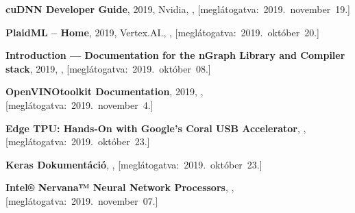 \begin{thebibliography}{9}


	\textbf{cuDNN Developer Guide},
	2019,
	Nvidia,
	,
	\mbox{[meglátogatva:~2019.~november~19.]}

	\textbf{PlaidML -- Home},
	2019,
	Vertex.AI.,
	,
	\mbox{[meglátogatva:~2019.~október~20.]}

	\textbf{Introduction --- Documentation for the {nGraph} Library and Compiler stack},
	2019,
	,
	\mbox{[meglátogatva:~2019.~október~08.]}

	\textbf{OpenVINO\textsuperscript{\texttrademark}\space toolkit Documentation},
	2019,
	,
	\mbox{[meglátogatva:~2019.~november~4.]}


	\textbf{Edge TPU: Hands-On with Google’s Coral USB Accelerator},
	,
	\mbox{[meglátogatva:~2019.~október~23.]}

	\textbf{Keras Dokumentáció},
	,
	\mbox{[meglátogatva:~2019.~október~23.]}

	\textbf{Intel® Nervana™ Neural Network Processors},
	,
	\mbox{[meglátogatva:~2019.~november~07.]}




\end{thebibliography}
